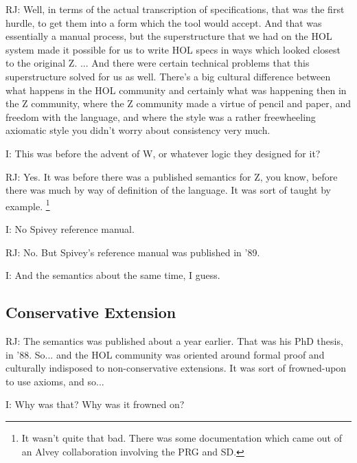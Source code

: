 \documentclass[10pt,titlepage]{book}
\begin{document}
RJ: Well, in terms of the actual transcription of specifications, that was the first hurdle, to get them into a form which the tool would accept.
And that was essentially a manual process, but the superstructure that we had on the HOL system made it possible for us to write HOL specs in ways which looked closest to the original Z.
... 
And there were certain technical problems that this superstructure solved for us as well.
There's a big cultural difference between what happens in the HOL community and certainly what was happening then in the Z community, where the Z community made a virtue of pencil and paper, and freedom with the language, and where the style was a rather freewheeling axiomatic style you didn't worry about consistency very much.

I: This was before the advent of W, or whatever logic they designed for it?

RJ: Yes.
It was before there was a published semantics for Z, you know, before there was much by way of definition of the language.
It was sort of taught by example.%
\footnote{
It wasn't quite that bad.
There was some documentation which came out of an Alvey collaboration involving the PRG and SD.
}

I: No Spivey reference manual.

RJ: No.
But Spivey's reference manual was published in '89.

I: And the semantics about the same time, I guess.

\subsection{Conservative Extension}

RJ: The semantics was published about a year earlier.
That was his PhD thesis, in '88.
So... and the HOL community was oriented around formal proof and culturally indisposed to non-conservative extensions.
It was sort of frowned-upon to use axioms, and so...

I: Why was that?
Why was it frowned on?
\end{document}
